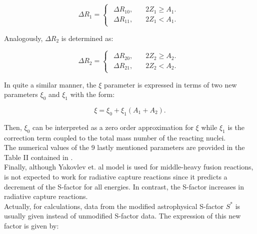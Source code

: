 \documentclass[openany]{book}
\begin{document}
\begin{equation} \label{eq:potential_Yakovlev_R1}
	\Delta R_1= 	\left\{\begin{array}{l}
		\begin{split}
			\Delta R_{10}, \quad & 2Z_1 \ge A_1.\\ 
			\Delta R_{11}, \quad & 2Z_1 < A_1.
		\end{split}
	\end{array}\right.
\end{equation}

Analogously, $\Delta R_2$ is determined as: 

\begin{equation} \label{eq:potential_Yakovlev_R2}
	\Delta R_2= 	\left\{\begin{array}{l}
		\begin{split}
			\Delta R_{20}, \quad & 2Z_2 \ge A_2.\\ 
			\Delta R_{21}, \quad & 2Z_2 < A_2.
		\end{split}
	\end{array}\right.
\end{equation}

In quite a similar manner, the $\xi$ parameter is expressed in terms of two new parameters $\xi_0$ and $\xi_1$ with the form:

\begin{equation} \label{eq:potential_Yakovlev_xi}
	\xi = 	\xi_0 + \xi_1(A_1 + A_2).
\end{equation}

Then, $\xi_0$ can be interpreted as a zero order approximation for $\xi$ while $\xi_1$ is the correction term coupled to the total mass number of the reacting nuclei. \\

The numerical values of the 9 lastly mentioned parameters are provided in the Table II contained in \cite{yakovlev_beard_gasques_wiescher_2010}. \\

Finally, although Yakovlev et. al model is used for middle-heavy fusion reactions, is not expected to work for radiative capture reactions since it predicts a decrement of the S-factor for all energies. In contrast, the S-factor increases in radiative capture reactions.  \\

Actually, for calculations, data from the modified astrophysical S-factor $S^{*}$ is usually given instead of unmodified S-factor data. The expression of this new factor is given by:
\end{document}

